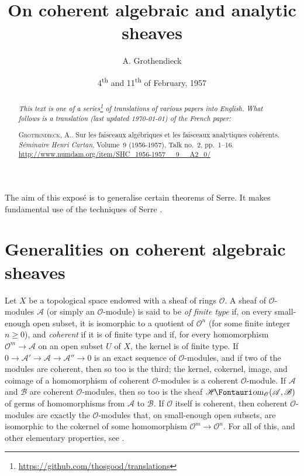 \documentclass{article}
\theoremstyle{plain}
\theoremstyle{definition}
\newcommand{\sh}{\mathscr}
\newcommand{\shHom}{\sh{H}\textup{\kern-2.2pt{\Fontauri\slshape om}}}
\renewcommand{\geq}{\geqslant}
\newcommand{\oldpage}[1]{\marginpar{\footnotesize$\Big\vert$ \textit{p.~#1}}}
\begin{document}
\renewcommand{\abstractname}{Translator's note.}

\title{On coherent algebraic and analytic sheaves}
\author{A. Grothendieck}
\date{4\textsuperscript{th} and 11\textsuperscript{th} of February, 1957}
\maketitle

\begin{abstract}
  \emph{This text is one of a series\footnote{\url{https://github.com/thosgood/translations}} of translations of various papers into English.}
  \emph{What follows is a translation (last updated \today) of the French paper:}

  \medskip\noindent
  \textsc{Grothendieck, A.}. Sur les faisceaux algébriques et les faisceaux analytiques cohérents. \emph{Séminaire Henri Cartan}, Volume~9 (1956-1957), Talk no.~2, pp.~1–16. {\footnotesize\url{http://www.numdam.org/item/SHC_1956-1957__9__A2_0/}}
\end{abstract}

\tableofcontents



\bigskip\bigskip
The aim of this exposé is to generalise certain theorems of Serre.
\oldpage{2-01}
It makes fundamental use of the techniques of Serre \cite{1,2,3}.


\section{Generalities on coherent algebraic sheaves}
\label{section1}

Let $X$ be a topological space endowed with a sheaf of rings $\sh{O}$.
A sheaf of $\sh{O}$-modules $\sh{A}$ (or simply an $\sh{O}$-module) is said to be \emph{of finite type} if, on every small-enough open subset, it is isomorphic to a quotient of $\sh{O}^n$ (for some finite integer $n\geq0$), and \emph{coherent} if it is of finite type and if, for every homomorphism $\sh{O}^m\to\sh{A}$ on an open subset $U$ of $X$, the kernel is of finite type.
If $0\to\sh{A}'\to\sh{A}\to\sh{A}''\to0$ is an exact sequence of $\sh{O}$-modules, and if two of the modules are coherent, then so too is the third;
the kernel, cokernel, image, and coimage of a homomorphism of coherent $\sh{O}$-modules is a coherent $\sh{O}$-module.
If $\sh{A}$ and $\sh{B}$ are coherent $\sh{O}$-modules, then so too is the sheaf $\shHom_\sh{O}(\sh{A},\sh{B})$ of germs of homomorphisms from $\sh{A}$ to $\sh{B}$.
If $\sh{O}$ itself is coherent, then coherent $\sh{O}$-modules are exactly the $\sh{O}$-modules that, on small-enough open subsets, are isomorphic to the cokernel of some homomorphism $\sh{O}^m\to\sh{O}^n$.
For all of this, and other elementary properties, see \cite[chapitre~1, paragraphe~2]{1}.
\end{document}
